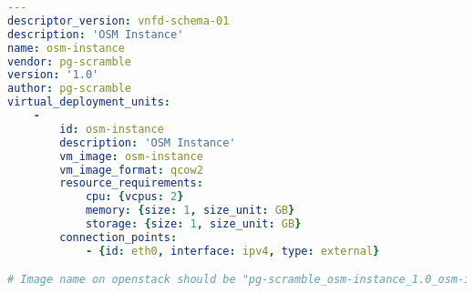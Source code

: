 \begin{lstlisting}[language=yaml,caption=OSM MANO instance VNFD,label=osmmanovnfd]
---
descriptor_version: vnfd-schema-01
description: 'OSM Instance'
name: osm-instance
vendor: pg-scramble
version: '1.0'
author: pg-scramble
virtual_deployment_units:
    -
        id: osm-instance
        description: 'OSM Instance'
        vm_image: osm-instance
        vm_image_format: qcow2
        resource_requirements:
            cpu: {vcpus: 2}
            memory: {size: 1, size_unit: GB}
            storage: {size: 1, size_unit: GB}
        connection_points:
            - {id: eth0, interface: ipv4, type: external}

# Image name on openstack should be "pg-scramble_osm-instance_1.0_osm-instance"
\end{lstlisting}